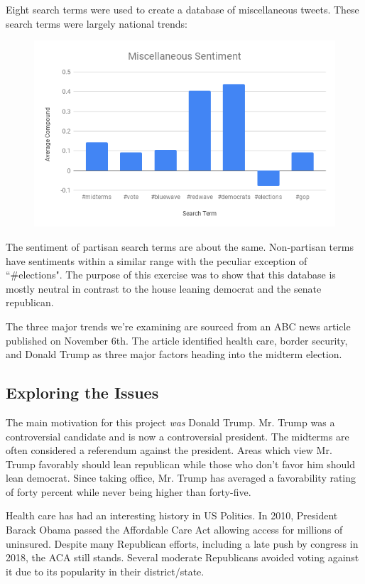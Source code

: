 \documentclass[11pt, twoside, reqno]{book}
\begin{document}
Eight search terms were used to create a database of miscellaneous tweets. These search terms were largely national trends:

\begin{figure}[H]
	\includegraphics[scale=0.5]{misc_sent}
\end{figure}

The sentiment of partisan search terms are about the same. Non-partisan terms have sentiments within a similar range with the peculiar exception of ``\#elections". The purpose of this exercise was to show that this database is mostly neutral in contrast to the house leaning democrat and the senate republican. 

The three major trends we're examining are sourced from an ABC news article published on November 6th. The article identified health care, border security, and Donald Trump as three major factors heading into the midterm election.

\subsection{Exploring the Issues}
\label{subsec:exploring the issues}
\hspace{0.2in}The main motivation for this project \textit{was} Donald Trump. Mr. Trump was a controversial candidate and is now a controversial president. The midterms are often considered a referendum against the president. Areas which view Mr. Trump favorably should lean republican while those who don't favor him should lean democrat. Since taking office, Mr. Trump has averaged a favorability rating of forty percent while never being higher than forty-five. 

Health care has had an interesting history in US Politics. In 2010, President Barack Obama passed the Affordable Care Act allowing access for millions of uninsured. Despite many Republican efforts, including a late push by congress in 2018, the ACA still stands. Several moderate Republicans avoided voting against it due to its popularity in their district/state. 
\end{document}
